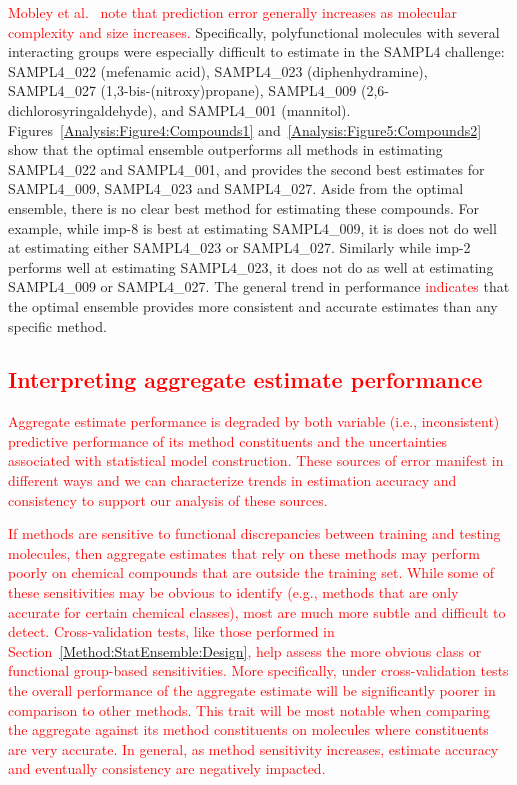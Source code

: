 \documentclass[journal=jpcbfk, manuscript=article]{achemso}
\newcommand{\+}[1]{\ensuremath{\mathbf{#1}}}
\newcommand{\rev}[1]{\textsf{\textcolor{red}{#1}}}
\begin{document}
\rev{Mobley et al.~\cite{Mobley:2014} note that prediction error generally increases as molecular complexity and size increases.} 
Specifically, polyfunctional molecules with several interacting groups were especially difficult to estimate in the SAMPL4 challenge: SAMPL4\_022 (mefenamic acid), SAMPL4\_023 (diphenhydramine), SAMPL4\_027 (1,3-bis-(nitroxy)propane), SAMPL4\_009 (2,6-dichlorosyringaldehyde), and SAMPL4\_001 (mannitol). 
Figures~\ref{Analysis:Figure4:Compounds1} and~\ref{Analysis:Figure5:Compounds2} show that the optimal ensemble outperforms all methods in estimating SAMPL4\_022 and SAMPL4\_001, and provides the second best estimates for SAMPL4\_009, SAMPL4\_023 and SAMPL4\_027.
Aside from the optimal ensemble, there is no clear best method for estimating these compounds.
For example, while imp-8 is best at estimating SAMPL4\_009, it is does not do well at estimating either SAMPL4\_023 or SAMPL4\_027.
Similarly while imp-2 performs well at estimating SAMPL4\_023, it does not do as well at estimating SAMPL4\_009 or SAMPL4\_027.
The general trend in performance \rev{indicates} that the optimal ensemble provides more consistent and accurate estimates than any specific method. 

\subsection{\rev{Interpreting aggregate estimate performance}}
\rev{Aggregate estimate performance is degraded by both variable (i.e., inconsistent) predictive performance of its method constituents and the uncertainties associated with statistical model construction.
These sources of error manifest in different ways and we can characterize trends in estimation accuracy and consistency to support our analysis of these sources.}

\rev{If methods are sensitive to functional discrepancies between training and testing molecules, then aggregate estimates that rely on these methods may perform poorly on chemical  compounds that are outside the training set. 
While some of these sensitivities may be obvious to identify (e.g., methods that are only accurate for certain chemical classes), most are much more subtle and difficult to detect. 
Cross-validation tests, like those performed in Section~\ref{Method:StatEnsemble:Design}, help assess the more obvious class or functional group-based sensitivities.
More specifically, under cross-validation tests the overall performance of the aggregate estimate will be significantly poorer in comparison to other methods. 
This trait will be most notable when comparing the aggregate against its method constituents on molecules where constituents are very accurate.
In general, as method sensitivity increases, estimate accuracy and eventually consistency are negatively impacted.}
\end{document}
